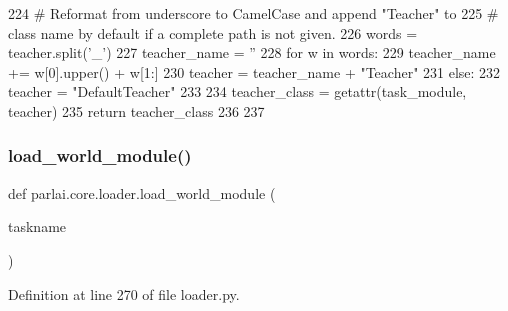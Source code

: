 \begin{DoxyCode}
224             \textcolor{comment}{# Reformat from underscore to CamelCase and append "Teacher" to}
225             \textcolor{comment}{# class name by default if a complete path is not given.}
226             words = teacher.split(\textcolor{stringliteral}{'\_'})
227             teacher\_name = \textcolor{stringliteral}{''}
228             \textcolor{keywordflow}{for} w \textcolor{keywordflow}{in} words:
229                 teacher\_name += w[0].upper() + w[1:]
230             teacher = teacher\_name + \textcolor{stringliteral}{"Teacher"}
231     \textcolor{keywordflow}{else}:
232         teacher = \textcolor{stringliteral}{"DefaultTeacher"}
233 
234     teacher\_class = getattr(task\_module, teacher)
235     \textcolor{keywordflow}{return} teacher\_class
236 
237 
\end{DoxyCode}
\mbox{\label{namespaceparlai_1_1core_1_1loader_adb9c272f49c31c45dcbc61d8e8c6316d}} 
\subsubsection{\texorpdfstring{load\+\_\+world\+\_\+module()}{load\_world\_module()}}
{\footnotesize\ttfamily def parlai.\+core.\+loader.\+load\+\_\+world\+\_\+module (\begin{DoxyParamCaption}\item[{}]{taskname }\end{DoxyParamCaption})}



Definition at line 270 of file loader.\+py.


